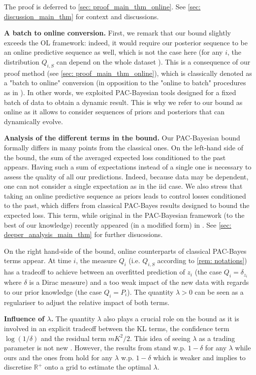 The proof is deferred to \cref{sec: proof_main_thm_online}. See \cref{sec: discussion_main_thm} for context and discussions.

\textbf{A batch to online conversion.}
   First, we remark that our bound slightly exceeds the OL framework: indeed, it would require our posterior sequence to be an online predictive sequence as well, which is not the case here (for any $i$, the distribution $Q_{i,S}$ can depend on the whole dataset ). This is a consequence of our proof method (see \cref{sec: proof_main_thm_online}), which is classically denoted as a "batch to online" conversion (in opposition to the "online to batch" procedures as in \citealp{dekel2005data}). In other words, we exploited PAC-Bayesian tools designed for a fixed batch of data to obtain a dynamic result. This is why we refer to our bound as online as it allows to consider sequences of priors and posteriors that can dynamically evolve.



\textbf{Analysis of the different terms in the bound.}
Our PAC-Bayesian bound formally differs in many points from the classical ones.
  On the left-hand side of the bound, the sum of the averaged expected loss conditioned to the past appears. Having such a sum of expectations instead of a single one is necessary to assess the quality of all our predictions. Indeed, because data may be dependent, one can not consider a single expectation as in the iid case. We also stress that taking an online predictive sequence as priors leads to control losses conditioned to the past, which differs from classical PAC-Bayes results designed to bound the expected loss. This term, while original in the PAC-Bayesian framework (to the best of our knowledge) recently appeared (in a modified form) in \citet[Prop 3]{wintenberger2021stochastic}. See \cref{sec: deeper_analysis_main_thm} for further disucssions.

  On the right hand-side of the bound, online counterparts of classical PAC-Bayes terms appear. At time $i$, the measure $Q_i$ (i.e. $Q_{i,S}$ according to \cref{rem: notations}) has a tradeoff to achieve between an overfitted prediction of $z_i$ (the case $Q_i=\delta_{z_i}$ where $\delta$ is a Dirac measure) and a too weak impact of the new data with regards to our prior knowledge (the case $Q_i=P_i$). The quantity $\lambda>0$ can be seen as a regulariser to adjust the relative impact of both terms.


\textbf{Influence of $\lambda$.}
The quantity $\lambda$ also plays a crucial role on the bound as it is involved in an explicit tradeoff between the KL terms, the confidence term $\log(1/\delta)$ and the residual term $mK^2/2$. This idea of seeing $\lambda$ as a trading parameter is not new \citep{thiemann2017strongly,germain2016pac}.
 However, the results from \citet{thiemann2017strongly} stand w.p. $1-\delta $ for any $\lambda$ while ours and the ones from \citet{germain2016pac} hold for any $\lambda$ w.p. $1-\delta$ which is weaker and implies to discretise $\mathbb{R}^+$ onto a grid to estimate the optimal $\lambda$.

